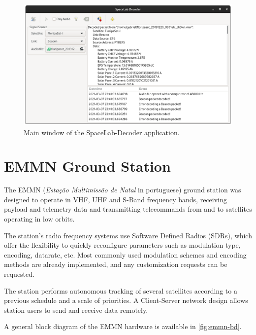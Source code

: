 \begin{figure}[!ht]
    \begin{center}
        \includegraphics[width=\textwidth]{figures/spacelab-decoder.png}
        \caption{Main window of the SpaceLab-Decoder application.}
        \label{fig:spacelab-decoder}
    \end{center}
\end{figure}

\section{EMMN Ground Station}

The EMMN (\textit{Estação Multimissão de Natal} in portuguese) ground station \cite{emmn} was designed to operate in VHF, UHF and S-Band frequency bands, receiving payload and telemetry data and transmitting telecommands from and to satellites operating in low orbits.

The station's radio frequency systems use Software Defined Radios (SDRs), which offer the flexibility to quickly reconfigure parameters such as modulation type, encoding, datarate, etc. Most commonly used modulation schemes and encoding methods are already implemented, and any customization requests can be requested.

The station performs autonomous tracking of several satellites according to a previous schedule and a scale of priorities. A Client-Server network design allows station users to send and receive data remotely.

A general block diagram of the EMMN hardware is available in \autoref{fig:emmn-bd}.

